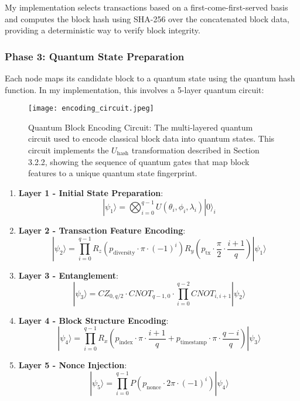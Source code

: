 \documentclass[11pt,a4paper]{article}
\begin{document}
My implementation selects transactions based on a first-come-first-served basis and computes the block hash using SHA-256 over the concatenated block data, providing a deterministic way to verify block integrity.

\subsubsection{Phase 3: Quantum State Preparation}
Each node maps its candidate block to a quantum state using the quantum hash function. In my implementation, this involves a 5-layer quantum circuit:

\begin{figure}[ht]
  \centering
  \texttt{[image: encoding\_circuit.jpeg]}
  \caption{Quantum Block Encoding Circuit: The multi-layered quantum circuit used to encode classical block data into quantum states. This circuit implements the $U_{\text{hash}}$ transformation described in Section 3.2.2, showing the sequence of quantum gates that map block features to a unique quantum state fingerprint.}
  \label{fig:encoding_circuit}
\end{figure}

\begin{enumerate}
    \item \textbf{Layer 1 - Initial State Preparation}:
    \begin{equation}
    |\psi_1\rangle = \bigotimes_{i=0}^{q-1} U(\theta_i, \phi_i, \lambda_i)|0\rangle_i
    \end{equation}
    \item \textbf{Layer 2 - Transaction Feature Encoding}:
    \begin{equation}
    |\psi_2\rangle = \prod_{i=0}^{q-1} R_z(p_{\text{diversity}} \cdot \pi \cdot (-1)^i) R_y(p_{\text{tx}} \cdot \frac{\pi}{2} \cdot \frac{i+1}{q})|\psi_1\rangle
    \end{equation}
    \item \textbf{Layer 3 - Entanglement}:
    \begin{equation}
    |\psi_3\rangle = CZ_{0,q/2} \cdot CNOT_{q-1,0} \cdot \prod_{i=0}^{q-2} CNOT_{i,i+1} |\psi_2\rangle
    \end{equation}
    \item \textbf{Layer 4 - Block Structure Encoding}:
    \begin{equation}
    |\psi_4\rangle = \prod_{i=0}^{q-1} R_x(p_{\text{index}} \cdot \pi \cdot \frac{i+1}{q} + p_{\text{timestamp}} \cdot \pi \cdot \frac{q-i}{q})|\psi_3\rangle
    \end{equation}
    \item \textbf{Layer 5 - Nonce Injection}:
    \begin{equation}
    |\psi_5\rangle = \prod_{i=0}^{q-1} P(p_{\text{nonce}} \cdot 2\pi \cdot (-1)^i)|\psi_4\rangle
    \end{equation}
\end{enumerate}
\end{document}

